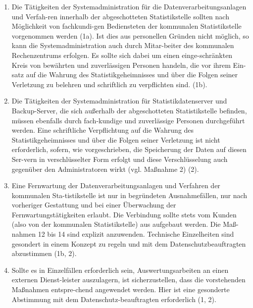 \begin{enumerate}[label=arabic*.]
            \item Die Tätigkeiten der Systemadministration für die Datenverarbeitungsanlagen und Verfah-ren innerhalb der abgeschotteten Statistikstelle sollten nach Möglichkeit von fachkundi-gen Bediensteten der kommunalen Statistikstelle vorgenommen werden (1a). Ist dies aus personellen Gründen nicht möglich, so kann die Systemadministration auch durch Mitar-beiter des kommunalen Rechenzentrums erfolgen. Es sollte sich dabei um einen einge-schränkten Kreis von bewährten und zuverlässigen Personen handeln, die vor ihrem Ein-satz auf die Wahrung des Statistikgeheimnisses und über die Folgen seiner Verletzung zu belehren und schriftlich zu verpflichten sind. (1b).
            \item Die Tätigkeiten der Systemadministration für Statistikdatenserver und Backup-Server, die sich außerhalb der abgeschotteten Statistikstelle befinden, müssen ebenfalls durch fach-kundige und zuverlässige Personen durchgeführt werden. Eine schriftliche Verpflichtung auf die Wahrung des Statistikgeheimnisses und über die Folgen seiner Verletzung ist nicht erforderlich, sofern, wie vorgeschrieben, die Speicherung der Daten auf diesen Ser-vern in verschlüsselter Form erfolgt und diese Verschlüsselung auch gegenüber den Administratoren wirkt (vgl. Maßnahme 2) (2).
            \item Eine Fernwartung der Datenverarbeitungsanlagen und Verfahren der kommunalen Sta-tistikstelle ist nur in begründeten Ausnahmefällen, nur nach vorheriger Gestattung und bei einer Überwachung der Fernwartungstätigkeiten erlaubt. Die Verbindung sollte stets vom Kunden (also von der kommunalen Statistikstelle) aus aufgebaut werden. Die Maß-nahmen 12 bis 14 sind explizit anzuwenden. Technische Einzelheiten sind gesondert in einem Konzept zu regeln und mit dem Datenschutzbeauftragten abzustimmen (1b, 2).
            \item Sollte es in Einzelfällen erforderlich sein, Auswertungsarbeiten an einen externen Dienst-leister auszulagern, ist sicherzustellen, dass die vorstehenden Maßnahmen entspre-chend angewendet werden. Hier ist eine gesonderte Abstimmung mit dem Datenschutz-beauftragten erforderlich (1, 2).
        \end{enumerate}
